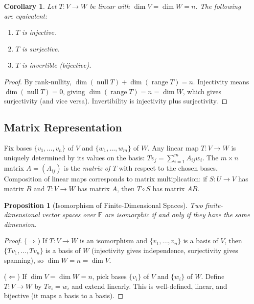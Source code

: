 \documentclass[11pt,a4paper]{article}
\theoremstyle{definition}
\theoremstyle{plain}
\newtheorem{proposition}[theorem]{Proposition}
\newtheorem{corollary}[theorem]{Corollary}
\theoremstyle{remark}
\newcommand{\F}{\mathbb{F}}
\DeclareMathOperator{\range}{range}
\DeclareMathOperator{\nullspace}{null}
\begin{document}
\begin{corollary}
\label{cor:rank_nullity_consequences}
Let $T: V \to W$ be linear with $\dim V = \dim W = n$. The following are equivalent:
\begin{enumerate}[nosep,label=(\roman*)]
    \item $T$ is injective.
    \item $T$ is surjective.
    \item $T$ is invertible (bijective).
\end{enumerate}
\end{corollary}

\begin{proof}
By rank-nullity, $\dim(\nullspace T) + \dim(\range T) = n$. Injectivity means
$\dim(\nullspace T) = 0$, giving $\dim(\range T) = n = \dim W$, which gives surjectivity
(and vice versa). Invertibility is injectivity plus surjectivity.
\end{proof}

\subsection{Matrix Representation}
\label{subsec:matrix_rep}

Fix bases $\{v_1, \ldots, v_n\}$ of $V$ and $\{w_1, \ldots, w_m\}$ of $W$. Any linear map
$T: V \to W$ is uniquely determined by its values on the basis:
$Tv_j = \sum_{i=1}^m A_{ij} w_i$. The $m \times n$ matrix $A = (A_{ij})$ is the
\emph{matrix of $T$} with respect to the chosen bases. Composition of linear maps
corresponds to matrix multiplication:
if $S: U \to V$ has matrix $B$ and $T: V \to W$ has matrix $A$, then $T \circ S$ has matrix $AB$.

\begin{proposition}[Isomorphism of Finite-Dimensional Spaces]
\label{prop:isomorphism}
Two finite-dimensional vector spaces over $\F$ are isomorphic if and only if they have the
same dimension.
\end{proposition}

\begin{proof}
($\Rightarrow$) If $T: V \to W$ is an isomorphism and $\{v_1, \ldots, v_n\}$ is a basis
of $V$, then $\{Tv_1, \ldots, Tv_n\}$ is a basis of $W$ (injectivity gives independence,
surjectivity gives spanning), so $\dim W = n = \dim V$.

($\Leftarrow$) If $\dim V = \dim W = n$, pick bases $\{v_i\}$ of $V$ and $\{w_i\}$ of $W$.
Define $T: V \to W$ by $Tv_i = w_i$ and extend linearly. This is well-defined, linear,
and bijective (it maps a basis to a basis).
\end{proof}
\end{document}
